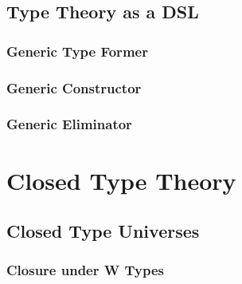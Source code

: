 \documentclass[12pt]{report}
\theoremstyle{definition}
\theoremstyle{remark}
\numberwithin{definition}{section}
\numberwithin{equation}{section}
\numberwithin{proposition}{section}
\numberwithin{conjecture}{section}
\numberwithin{theorem}{section}
\numberwithin{lemma}{section}
\numberwithin{corollary}{section}
\numberwithin{example}{section}
\numberwithin{remark}{section}
\begin{document}
\chapter{Type Theory as a DSL}\label{ch:gelim}
\section{Generic Type Former}
\section{Generic Constructor}
\section{Generic Eliminator}





\part{Closed Type Theory}\label{part:closed}




\chapter{Closed Type Universes}\label{ch:closed}
\section{Closure under W Types}
\end{document}

